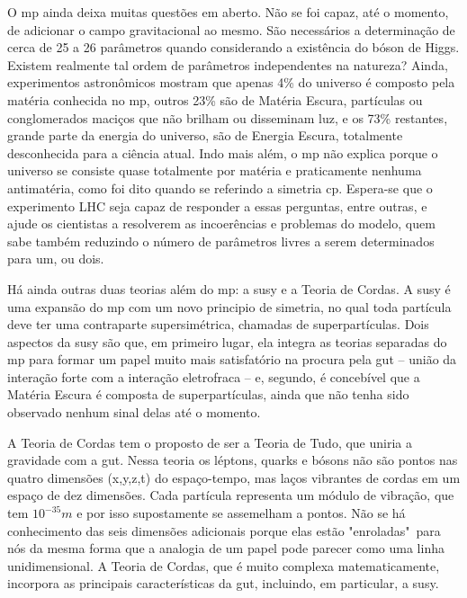 O \gls{mp} ainda deixa muitas questões em aberto. Não se foi capaz, até o
momento, de adicionar o campo gravitacional ao mesmo. São necessários a
determinação de cerca de 25 a 26 parâmetros quando considerando a existência do
bóson de Higgs. Existem realmente tal ordem de parâmetros independentes na
natureza? Ainda, experimentos astronômicos mostram que apenas 4\% do universo é
composto pela matéria conhecida no \gls{mp}, outros 23\% são de Matéria
Escura, partículas ou conglomerados maciços que não brilham ou disseminam luz,
e os 73\% restantes, grande parte da energia do universo, são de Energia Escura,
totalmente desconhecida para a ciência atual. Indo mais além, o \gls{mp} 
não explica porque o universo se consiste quase totalmente por matéria e
praticamente nenhuma antimatéria, como foi dito quando se referindo a simetria
\gls{cp}. Espera-se que o experimento LHC seja capaz de responder a essas perguntas, entre outras, 
e ajude os cientistas a resolverem as incoerências e problemas do modelo, quem sabe também reduzindo 
o número de parâmetros livres a serem determinados para um, ou dois.
\cite{nature_space_and_time,Intro_Nuclear}

Há ainda outras duas teorias além do \gls{mp}: a \gls{susy} e a Teoria de Cordas. 
A \gls{susy} é uma expansão do \gls{mp} com um
novo principio de simetria, no qual toda partícula deve ter uma contraparte
supersimétrica, chamadas de superpartículas. Dois aspectos da \gls{susy} são
que, em primeiro lugar, ela integra as teorias separadas do \gls{mp} para formar
um papel muito mais satisfatório na procura pela \gls{gut} -- união da interação
forte com a interação eletrofraca -- e, segundo, é concebível que a Matéria Escura 
é composta de superpartículas, ainda que não tenha sido observado nenhum sinal delas 
até o momento. 

A Teoria de Cordas tem o proposto de ser a Teoria de Tudo, que uniria a
gravidade com a \gls{gut}. Nessa teoria os léptons, quarks e bósons não são
pontos nas quatro dimensões (x,y,z,t) do espaço-tempo, mas laços vibrantes de
cordas em um espaço de dez dimensões. Cada partícula representa um módulo de
vibração, que tem $10^{-35} m$ e por isso supostamente se
assemelham a pontos. Não se há conhecimento das seis dimensões adicionais porque
elas estão "enroladas"~para nós da mesma forma que a analogia de um papel pode
parecer como uma linha unidimensional. A Teoria de Cordas, que é muito complexa
matematicamente, incorpora as principais características da \gls{gut}, incluindo,
em particular, a \gls{susy}.

